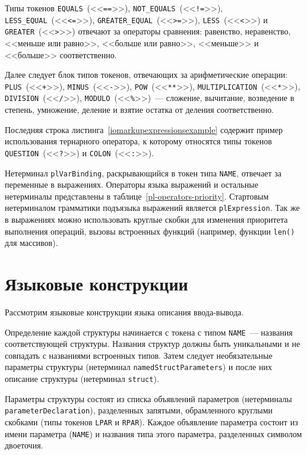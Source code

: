 \documentclass[times,specification,annotation]{style/itmo-student-thesis/itmo-student-thesis}
\begin{document}
Типы токенов \texttt{EQUALS}~(<<\texttt{==}>>), \texttt{NOT\_EQUALS}~(<<\texttt{!=}>>), \texttt{LESS\_EQUAL}~(<<\texttt{<=}>>), \texttt{GREATER\_EQUAL}~(<<\texttt{>=}>>), \texttt{LESS}~(<<\texttt{<}>>) и \texttt{GREATER}~(<<\texttt{>}>>) отвечают за операторы сравнения: равенство, неравенство, <<меньше или равно>>, <<больше или равно>>, <<меньше>> и <<больше>> соответственно.

Далее следует блок типов токенов, отвечающих за арифметические операции: \texttt{PLUS}~(<<\texttt{+}>>), \texttt{MINUS}~(<<\texttt{-}>>), \texttt{POW}~(<<\texttt{**}>>), \texttt{MULTIPLICATION}~(<<\texttt{*}>>), \texttt{DIVISION}~(<<\texttt{/}>>), \texttt{MODULO}~(<<\texttt{\%}>>)~--- сложение, вычитание, возведение в степень, умножение, деление и взятие остатка от деления соответственно. 

Последняя строка листинга~\ref{iomarkupexpressionsexample} содержит пример использования тернарного оператора, к которому относятся типы токенов \texttt{QUESTION}~(<<\texttt{?}>>) и \texttt{COLON}~(<<\texttt{:}>>).

Нетерминал \texttt{plVarBinding}, раскрывающийся в токен типа \texttt{NAME}, отвечает за переменные в выражениях. Операторы языка выражений и остальные нетерминалы представлены в таблице~\ref{pl-operators-priority}. Стартовым нетерминалом грамматики подъязыка выражений является \texttt{plExpression}. Так же в выражениях можно использовать круглые скобки для изменения приоритета выполнения операций, вызовы встроенных функций (например, функции \texttt{len()} для массивов).

\section{Языковые конструкции}

Рассмотрим языковые конструкции языка описания ввода-вывода.

Определение каждой структуры начинается с токена с типом \texttt{NAME}~--- названия соответствующей структуры. Названия структур должны быть уникальными и не совпадать с названиями встроенных типов. Затем следует необязательные параметры структуры (нетерминал \texttt{namedStructParameters}) и после них описание структуры (нетерминал \texttt{struct}).

Параметры структуры состоят из списка объявлений параметров (нетерминалы \texttt{parameterDeclaration}), разделенных запятыми, обрамленного круглыми скобками (типы токенов \texttt{LPAR} и \texttt{RPAR}). Каждое объявление параметра состоит из имени параметра (\texttt{NAME}) и названия типа этого параметра, разделенных символом двоеточия.
\end{document}

